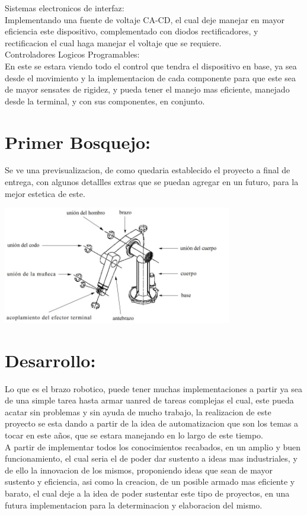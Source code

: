 \documentclass[14pt,a4paper]{article}
\begin{document}
Sistemas electronicos de interfaz:\\
Implementando una fuente de voltaje CA-CD, el cual deje manejar en mayor eficiencia este dispositivo, complementado con diodos rectificadores, y rectificacion el cual haga manejar el voltaje que se requiere.\\

Controladores Logicos Programables:\\
En este se estara viendo todo el control que tendra el dispositivo en base, ya sea desde el movimiento y la implementacion de cada componente para que este sea de mayor sensates de rigidez, y pueda tener el manejo mas eficiente, manejado desde la terminal, y con sus componentes, en conjunto.

\section{Primer Bosquejo:}
Se ve una previsualizacion, de como quedaria establecido el proyecto a final de entrega, con algunos detallles extras que se puedan agregar en un futuro, para la mejor estetica de este.

\begin{center}
\includegraphics[width=10cm]{Bosquejo.jpeg} 
\end{center}

\section{Desarrollo:}

Lo que es el brazo robotico, puede tener muchas implementaciones a partir ya sea de una simple tarea hasta armar uanred de tareas complejas el cual, este pueda acatar sin problemas y sin ayuda de mucho trabajo, la realizacion de este proyecto se esta dando a partir de la idea de automatizacion que son los temas a tocar en este años, que se estara manejando en lo largo de este tiempo.\\
A partir de implementar todos los conocimientos recabados, en un amplio y buen funcionamiento, el cual seria el de poder dar sustento a ideas mas industriales, y de ello la innovacion de los mismos, proponiendo ideas que sean de mayor sustento y eficiencia, asi como la creacion, de un posible armado mas eficiente y barato, el cual deje a la idea de poder sustentar este tipo de proyectos, en una futura implementacion para la determinacion y elaboracion del mismo.
\end{document}
